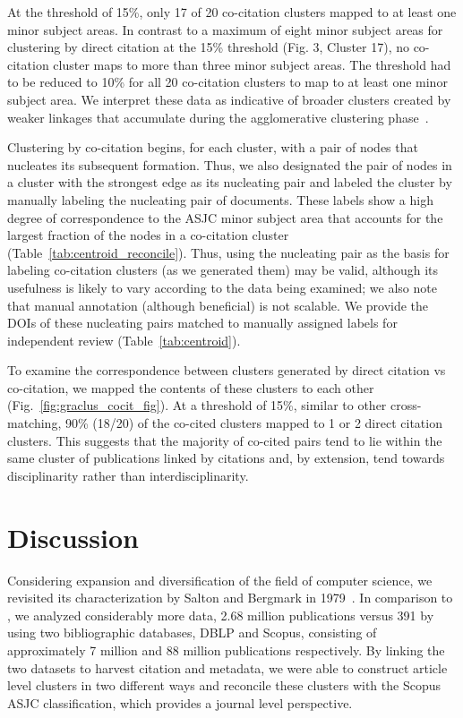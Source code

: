 At the threshold of 15\%, only 17 of 20 co-citation clusters mapped to at least one minor subject areas. In contrast to a maximum of eight minor subject areas for clustering by direct citation at the 15\% threshold (Fig. 3, Cluster 17), no co-citation cluster maps to more than three minor subject areas. The threshold had to be reduced to 10\% for all 20 co-citation clusters to map to at least one minor subject area. We interpret these data as indicative of broader clusters created by weaker linkages that accumulate during the agglomerative clustering phase~\cite{small_clustering_1985}. 

Clustering by co-citation begins, for each cluster, with a pair of nodes that nucleates its subsequent formation. Thus, we also designated the pair of nodes in a cluster with the strongest edge as its nucleating pair and labeled the cluster by manually labeling the nucleating pair of documents.  
These labels show a high degree of correspondence  to the ASJC minor subject area that accounts for the largest fraction of the nodes in a co-citation cluster (Table~\ref{tab:centroid_reconcile}). 
Thus, using the nucleating pair as the basis for labeling co-citation clusters (as we generated them) may be valid, although its usefulness is likely to vary according to the data being examined; we also note that manual annotation (although beneficial) is not scalable. We provide the DOIs of these nucleating pairs matched to manually assigned labels for independent review (Table~\ref{tab:centroid}).

To examine the correspondence between clusters generated by direct citation vs co-citation, we mapped the contents of these clusters to each other (Fig.~\ref{fig:graclus_cocit_fig}).
 At a threshold of 15\%, similar to other cross-matching, 90\% (18/20) of the co-cited clusters mapped to 1 or 2 direct citation clusters. This suggests that the majority of co-cited pairs tend to lie within the same cluster of publications linked by citations and,  by extension, tend towards disciplinarity rather than interdisciplinarity.

\section{Discussion} 
Considering expansion and diversification of the field of computer science, we revisited its characterization by Salton and Bergmark in 1979~\cite{salton_citation_1979}. In comparison to \cite{salton_citation_1979}, we analyzed considerably more data, 2.68 million publications versus 391 by using two bibliographic databases, DBLP and Scopus, consisting of  approximately 7 million and 88 million publications respectively. By linking the two datasets to harvest citation and metadata, we were able to construct article level clusters in two different ways and reconcile these clusters with the Scopus ASJC classification, which provides a journal level perspective.

